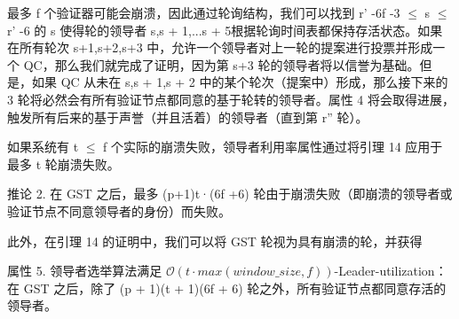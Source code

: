 最多 f 个验证器可能会崩溃，因此通过轮询结构，我们可以找到 r' -6f -3 $\leq$ s $\leq$ r' -6 的 s 使得轮的领导者 s,s + 1,...s + 5根据轮询时间表都保持存活状态。如果在所有轮次 s+1,s+2,s+3 中，允许一个领导者对上一轮的提案进行投票并形成一个 QC，那么我们就完成了证明，因为第 s+3 轮的领导者将以信誉为基础。但是，如果 QC 从未在 s,s + 1,s + 2 中的某个轮次（提案中）形成，那么接下来的 3 轮将必然会有所有验证节点都同意的基于轮转的领导者。属性 4 将会取得进展，触发所有后来的基于声誉（并且活着）的领导者（直到第 r'' 轮）。

如果系统有 t $\leq$ f 个实际的崩溃失败，领导者利用率属性通过将引理 14 应用于最多 t 轮崩溃失败。

推论 2. 在 GST 之后，最多 (p+1)t·(6f +6) 轮由于崩溃失败（即崩溃的领导者或验证节点不同意领导者的身份）而失败。

此外，在引理 14 的证明中，我们可以将 GST 轮视为具有崩溃的轮，并获得

属性 5. 领导者选举算法满足 $\mathcal{O}(t · max(window\_size,f))$-Leader-utilization：在 GST 之后，除了 (p + 1)(t + 1)(6f + 6) 轮之外，所有验证节点都同意存活的领导者。